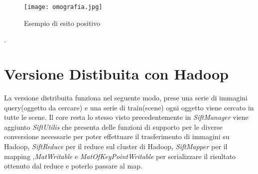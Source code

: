 \begin{itemize}
\begin{figure}[ht]
  \begin{center}
    \texttt{[image: omografia.jpg]}
    \caption{Esempio di esito positivo}
    \label{fig:hom}
    	\end{center}
\end{figure}

\end{itemize}.
\section{Versione Distibuita con Hadoop}
La versione distribuita funziona nel seguente modo, prese una serie di immagini query(oggetto da cercare) e una serie di train(scene) ogni oggetto viene cercato in tutte le scene. Il core resta lo stesso visto precedentemente in \emph{\textit{SiftManager}} viene aggiunto \emph{\textit{SiftUtilis}} che presenta delle funzioni di supporto per le diverse conversione necessarie per poter effettuare il trasferimento di immagini su Hadoop, \emph{\textit{SiftReduce}} per il reduce sul cluster di Hadoop, \emph{\textit{SiftMapper}} per il mapping ,\emph{\textit{MatWritable}} e \emph{\textit{MatOfKeyPointWritable}} per serializzare il risultato ottenuto dal reduce e poterlo passare al map.\\
